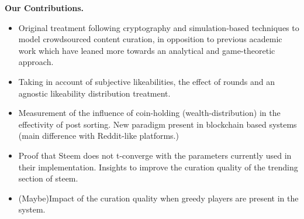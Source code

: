   \textbf{Our Contributions.}
  \begin{itemize}
  \item Original treatment following cryptography and simulation-based techniques to model crowdsourced content curation, in opposition to previous academic work which have leaned more towards an analytical and game-theoretic approach.

  \item Taking in account of subjective likeabilities, the effect of rounds and an agnostic likeability distribution treatment.

  \item Measurement of the influence of coin-holding (wealth-distribution) in the effectivity of post sorting. New paradigm present in blockchain based systems (main difference with Reddit-like platforms.)

  \item Proof that Steem does not t-converge with the parameters currently used in their implementation. Insights to improve the curation quality of the trending section of steem.

  \item (Maybe)Impact of the curation quality when greedy players are present in the system.
  \end{itemize}
